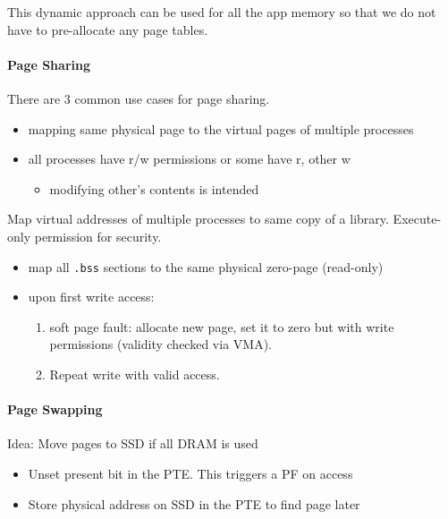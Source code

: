 \newpar{}

This dynamic approach can be used for all the app memory so that we do not have to pre-allocate any page tables.

\paragraph{Page Sharing}
There are 3 common use cases for page sharing.

\newpar{}

\begin{itemize}
    \item mapping same physical page to the virtual pages of multiple processes
    \item all processes have r/w permissions or some have r, other w
          \begin{itemize}
              \item modifying other's contents is intended
          \end{itemize}
\end{itemize}

\newpar{}

Map virtual addresses of multiple processes to same copy of a library. Execute-only permission for security.

\newpar{}

\begin{itemize}
    \item map all \texttt{.bss} sections to the same physical zero-page (read-only)
    \item upon first write access:
          \begin{enumerate}
              \item soft page fault: allocate new page, set it to zero but with write permissions (validity checked via VMA).
              \item Repeat write with valid access.
          \end{enumerate}
\end{itemize}

\paragraph{Page Swapping}
Idea: Move pages to SSD if all DRAM is used %
\begin{itemize}
    \item Unset present bit in the PTE. This triggers a PF on access
    \item Store physical address on SSD in the PTE to find page later
\end{itemize}


